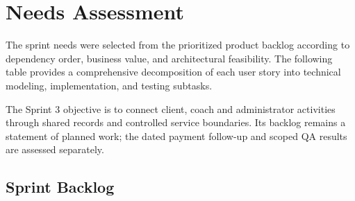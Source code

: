 \documentclass[12pt,a4paper,openany]{report}
\begin{document}
\section{Needs Assessment}

The sprint needs were selected from the prioritized product backlog according to dependency order, business value, and architectural feasibility. The following table provides a comprehensive decomposition of each user story into technical modeling, implementation, and testing subtasks.


The Sprint 3 objective is to connect client, coach and administrator activities through shared records and controlled service boundaries. Its backlog remains a statement of planned work; the dated payment follow-up and scoped QA results are assessed separately.


\subsection{Sprint Backlog}
\end{document}
